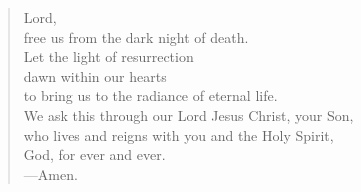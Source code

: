 \prayer

\setlength{\leftmargini}{\prayerleftmargini}

\begin{verse}
Lord,\\
free us from the dark night of death.\\
Let the light of resurrection\\
dawn within our hearts\\
to bring us to the radiance of eternal life.\\
We ask this through our Lord Jesus Christ, your Son,\\
who lives and reigns with you and the Holy Spirit,\\
God, for ever and ever.\\
{\color{red}---\thinspace}Amen.
\end{verse}

\setlength{\leftmargini}{\defleftmargini}